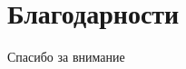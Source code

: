 \documentclass[aspectratio=169, xcolor=table]{beamer}
\begin{document}
		\section*{Благодарности}
{
\begin{frame}{}
\centering
{\Huge Спасибо за внимание} 
\end{frame}
}
\end{document}
